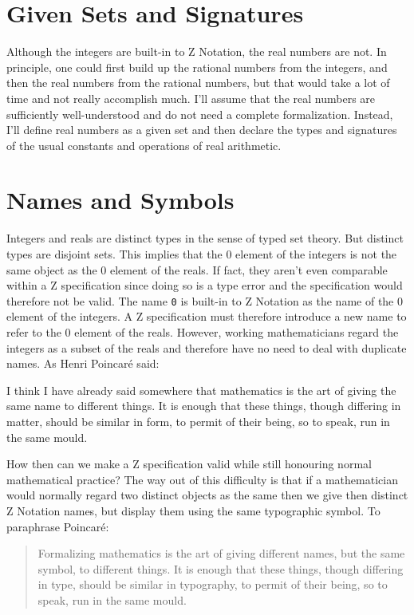 \documentclass[11pt, oneside]{article}
\begin{document}
\section{Given Sets and Signatures}

Although the integers are built-in to Z Notation, the real numbers are not.
In principle, one could first build up the rational numbers from the integers,
and then the real numbers from the rational numbers, but that would take a lot of time and not really
accomplish much.
I'll assume that the real numbers are sufficiently well-understood and do not need a complete formalization.
Instead, I'll define real numbers as a given set and then declare the types and signatures of the usual constants and operations of real arithmetic.

\section{Names and Symbols}

Integers and reals are distinct types in the sense of typed set theory.
But distinct types are disjoint sets.
This implies that the $0$ element of the integers is not the same object as the $0$ element of the reals.
If fact, they aren't even comparable within a Z specification since doing so is a type error and the 
specification would therefore not be valid.
The name \texttt{0} is built-in to Z Notation as the name of the $0$ element of the integers.
A Z specification must therefore introduce a new name to refer to the $0$ element of the reals.
However, working mathematicians regard the integers as a subset of the reals and therefore have no need to deal with duplicate names.
As Henri Poincar\'{e} \cite{poincare-fm} said:
\begin{displayquote}
I think I have already said somewhere that mathematics is the art of giving the same name to different things. 
It is enough that these things, though differing in matter, should be similar in form, to permit of their being, so to speak, run in the same mould.\end{displayquote}

How then can we make a Z specification valid while still honouring normal mathematical practice?
The way out of this difficulty is that if a mathematician would normally regard two distinct objects as the same
then we give then distinct Z Notation names, but display them using the same typographic symbol.
To paraphrase Poincar\'{e}:
\begin{quote}
Formalizing mathematics is the art of giving different names, but the same symbol, to different things. 
It is enough that these things, though differing in type, should be similar in typography, 
to permit of their being, so to speak, run in the same mould.
\end{quote}
\end{document}
